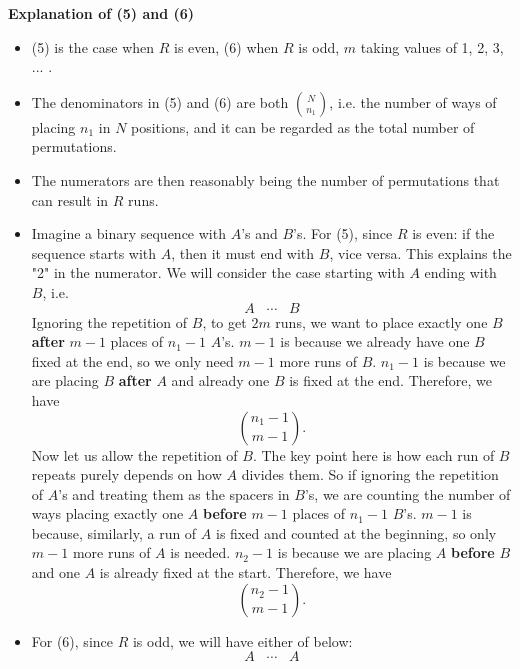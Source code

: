\documentclass[12pt]{article}
\theoremstyle{plain}
\theoremstyle{definition}
\theoremstyle{remark}
\begin{document}
\textbf{Explanation of (5) and (6)}
\begin{itemize}
    \item (5) is the case when $R$ is even, (6) when $R$ is odd, $m$ taking values of 1, 2, 3, ... .
    \item The denominators in (5) and (6) are both $\binom{N}{n_1}$, i.e. the number of ways of placing $n_1$ in $N$ positions, and it can be regarded as the total number of permutations. 
    \item The numerators are then reasonably being the number of permutations that can result in $R$ runs.
    \item Imagine a binary sequence with $A$'s and $B$'s. For (5), since $R$ is even: if the sequence starts with $A$, then it must end with $B$, vice versa. This explains the "2" in the numerator. We will consider the case starting with $A$ ending with $B$, i.e. $$A\;\;\; \cdots \;\;\; B$$Ignoring the repetition of $B$, to get $2m$ runs, we want to place exactly one $B$ \textbf{after} $m-1$ places of $n_1-1$ $A$'s. $m-1$ is because we already have one $B$ fixed at the end, so we only need $m-1$ more runs of $B$. $n_1-1$ is because we are placing $B$ \textbf{after} $A$ and already one $B$ is fixed at the end. Therefore, we have $$\binom{n_1-1}{m-1}.$$ Now let us allow the repetition of $B$. The key point here is how each run of $B$ repeats purely depends on how $A$ divides them. So if ignoring the repetition of $A$'s and treating them as the spacers in $B$'s, we are counting the number of ways placing exactly one $A$ \textbf{before} $m-1$ places of $n_1-1$ $B$'s. $m-1$ is because, similarly, a run of $A$ is fixed and counted at the beginning, so only $m-1$ more runs of $A$ is needed. $n_2-1$ is because we are placing $A$ \textbf{before} $B$ and one $A$ is already fixed at the start. Therefore, we have $$\binom{n_2-1}{m-1}.$$
    \item For (6), since $R$ is odd, we will have either of below: $$A\;\;\; \cdots \;\;\; A$$

\end{itemize}
\end{document}
